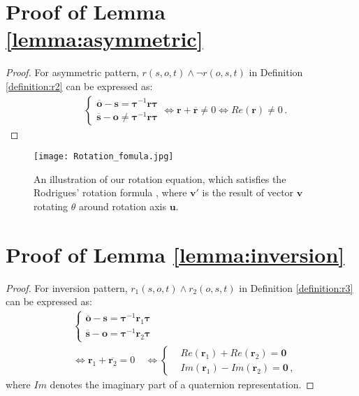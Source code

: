\documentclass[11pt]{article}
\newcommand{\vect}[1]{\mathbf{#1}\xspace}
\newcommand{\vects}{\vect{s}\xspace}
\newcommand{\vectr}{\vect{r}\xspace}
\newcommand{\vecto}{\vect{o}\xspace}
\begin{document}
\section{Proof of Lemma \ref{lemma:asymmetric}}
\label{app:proof_asymmetric}
\begin{proof}
For asymmetric pattern, $ r(s,o,t) \land \lnot r(o,s,t)$ in Definition \ref{definition:r2} can be expressed as:
\begin{equation}
\begin{aligned}
&\left\{  
     \begin{aligned}
     \overline{\vecto} - \vects  = \pmb{\tau}^{-1} \vectr \pmb{\tau} \\
    \overline{\vects} - \vecto  \neq \pmb{\tau}^{-1} \vectr \pmb{\tau}
    \end{aligned}
\right.
\Leftrightarrow 
\vectr + \overline{\vectr}\neq0
\Leftrightarrow 
Re(\vectr)\neq0 \, .
\end{aligned}
\end{equation}
\end{proof}


\begin{figure}[!t]
\centering
\texttt{[image: Rotation\_fomula.jpg]} 
\caption{An illustration of our rotation equation, which satisfies the Rodrigues' rotation formula \cite{rodrigues1840lois}, where $\vect{v'}$ is the result of vector $\vect{v}$ rotating $\theta$ around rotation axis $\vect{u}$.}
\label{figure:Fodrigues}
\end{figure}


\section{Proof of Lemma \ref{lemma:inversion}}
\label{app:proof_inversion}
\begin{proof}
For inversion pattern, $ r_1(s,o,t) \land r_2(o,s,t)$ in Definition \ref{definition:r3} can be expressed as:
\begin{equation}\label{equation:inverse}
\begin{aligned}
&\left\{  
     \begin{aligned}
     \overline{\vecto} - \vects  = \pmb{\tau}^{-1} \vect{r}_1 \pmb{\tau} \\
    \overline{\vects} - \vecto  = \pmb{\tau}^{-1} \vect{r}_2 \pmb{\tau}
    \end{aligned}
\right.
\\
&\Leftrightarrow
\vect{r}_1 + \overline{\vect{r}_2}=0 \quad
\Leftrightarrow 
\left\{  
     \begin{aligned}
     &Re(\vect{r}_1) + Re(\vect{r}_2) = \vect{0} \\
    &Im(\vect{r}_1) - Im(\vect{r}_2) = \vect{0} \,,
    \end{aligned}
\right.
\end{aligned}
\end{equation}
where $Im$ denotes the imaginary part of a quaternion representation.
\end{proof}
\end{document}
